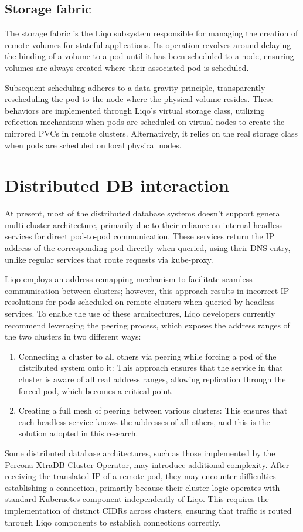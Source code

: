 \subsection{Storage fabric}
The storage fabric is the Liqo subsystem responsible for managing the creation of remote volumes for stateful applications. Its operation revolves around delaying the binding of a volume to a pod until it has been scheduled to a node, ensuring volumes are always created where their associated pod is scheduled. 

Subsequent scheduling adheres to a data gravity principle, transparently rescheduling the pod to the node where the physical volume resides. These behaviors are implemented through Liqo's virtual storage class, utilizing reflection mechanisms when pods are scheduled on virtual nodes to create the mirrored PVCs in remote clusters. Alternatively, it relies on the real storage class when pods are scheduled on local physical nodes.

\section{Distributed DB interaction}
At present, most of the distributed database systems doesn't support general multi-cluster architecture, primarily due to their reliance on internal headless services for direct pod-to-pod communication. These services return the IP address of the corresponding pod directly when queried, using their DNS entry, unlike regular services that route requests via kube-proxy. 

Liqo employs an address remapping mechanism to facilitate seamless communication between clusters; however, this approach results in incorrect IP resolutions for pods scheduled on remote clusters when queried by headless services. To enable the use of these architectures, Liqo developers currently recommend\cite{l2-1} leveraging the peering process, which exposes the address ranges of the two clusters in two different ways:
\begin{enumerate}
\item Connecting a cluster to all others via peering while forcing a pod of the distributed system onto it: This approach ensures that the service in that cluster is aware of all real address ranges, allowing replication through the forced pod, which becomes a critical point.
\item Creating a full mesh of peering between various clusters: This ensures that each headless service knows the addresses of all others, and this is the solution adopted in this research.
\end{enumerate}
Some distributed database architectures, such as those implemented by the Percona XtraDB Cluster Operator, may introduce additional complexity. After receiving the translated IP of a remote pod, they may encounter difficulties establishing a connection, primarily because their cluster logic operates with standard Kubernetes component independently of Liqo. This requires the implementation of distinct CIDRs across clusters, ensuring that traffic is routed through Liqo components to establish connections correctly.